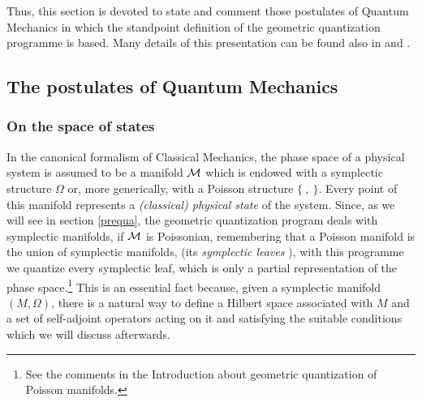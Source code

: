 \documentclass[12pt]{article}
\begin{document}
Thus, this section is devoted to state and comment
those postulates of Quantum Mechanics in which the standpoint
definition of the geometric quantization programme is based.
Many details of this presentation can be found also in
\cite{Ki-gq} and \cite{Tu-96}.



\subsection{The postulates of Quantum Mechanics}


\subsubsection{On the space of states}


In the canonical formalism of Classical Mechanics,
the phase space of a physical system is assumed to be a manifold ${\cal
M}$
which is endowed with a symplectic structure $\Omega$
or, more generically, with a Poisson structure $\{\ ,\ \}$.
Every point of this manifold represents a {\it (classical) physical
state} of the system.
Since, as we will see in section \ref{prequa},
the geometric quantization program deals with symplectic manifolds,
if ${\cal M}$ is Poissonian,
remembering that a Poisson manifold is the union of symplectic
manifolds,
(its {\it symplectic leaves} \cite{LM-87}), with this programme
we quantize every symplectic leaf, which is only a partial
representation of the phase space.\footnote{
See the comments in the Introduction about
geometric quantization of Poisson manifolds.
}
This is an essential fact because, given a symplectic manifold
$(M,\Omega )$,
there is a natural way to define a Hilbert space associated with $M$
and a set of self-adjoint operators acting on it and satisfying
the suitable conditions which we will discuss afterwards.
\end{document}
